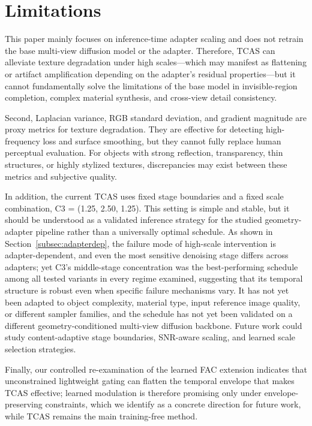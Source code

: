 \documentclass[times,twocolumn,final]{elsarticle}
\begin{document}
\section{Limitations}
\label{sec:limitations}

This paper mainly focuses on inference-time adapter scaling and does not retrain the base multi-view diffusion model or the adapter. Therefore, TCAS can alleviate texture degradation under high scales---which may manifest as flattening or artifact amplification depending on the adapter's residual properties---but it cannot fundamentally solve the limitations of the base model in invisible-region completion, complex material synthesis, and cross-view detail consistency.

Second, Laplacian variance, RGB standard deviation, and gradient magnitude are proxy metrics for texture degradation. They are effective for detecting high-frequency loss and surface smoothing, but they cannot fully replace human perceptual evaluation. For objects with strong reflection, transparency, thin structures, or highly stylized textures, discrepancies may exist between these metrics and subjective quality.

In addition, the current TCAS uses fixed stage boundaries and a fixed scale combination, C3 = (1.25, 2.50, 1.25). This setting is simple and stable, but it should be understood as a validated inference strategy for the studied geometry-adapter pipeline rather than a universally optimal schedule. As shown in Section~\ref{subsec:adapterdep}, the failure mode of high-scale intervention is adapter-dependent, and even the most sensitive denoising stage differs across adapters; yet C3's middle-stage concentration was the best-performing schedule among all tested variants in every regime examined, suggesting that its temporal structure is robust even when specific failure mechanisms vary. It has not yet been adapted to object complexity, material type, input reference image quality, or different sampler families, and the schedule has not yet been validated on a different geometry-conditioned multi-view diffusion backbone. Future work could study content-adaptive stage boundaries, SNR-aware scaling, and learned scale selection strategies.

Finally, our controlled re-examination of the learned FAC extension indicates that unconstrained lightweight gating can flatten the temporal envelope that makes TCAS effective; learned modulation is therefore promising only under envelope-preserving constraints, which we identify as a concrete direction for future work, while TCAS remains the main training-free method.
\end{document}

